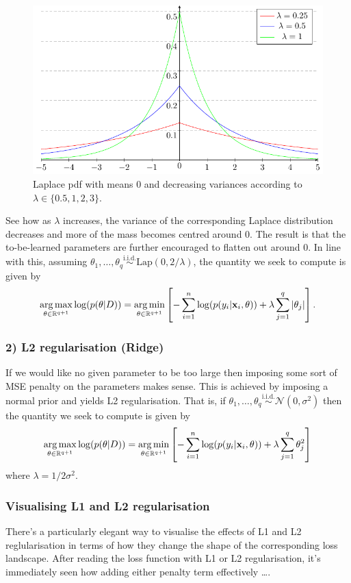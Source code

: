 \documentclass[11pt]{article}
\begin{document}
\begin{figure}[t]
    \centering
    \includegraphics[width=\columnwidth]{./figures/supervised_learning/laplace_pdf.pdf}
    \caption{Laplace pdf with means 0 and decreasing variances according to $\lambda\in\{0.5,1,2,3\}$.}
    \label{fig:laplace_pdf}
\end{figure}

See how as $\lambda$ increases, the variance of the corresponding Laplace distribution decreases and more of the mass becomes centred around 0. The result is that the to-be-learned parameters are further encouraged to flatten out around 0. In line with this, assuming $\theta_1,\dots,\theta_q\overset{\text{i.i.d.}}{\sim}\text{Lap}(0, 2/\lambda)$, the quantity we seek to compute is given by
$$
\operatorname*{arg\,max}_{\theta\in\mathbb{R}^{q+1}}\log(p(\theta|D))
=
\operatorname*{arg\,min}_{\theta\in\mathbb{R}^{q+1}}\left[-\sum_{i=1}^n\log(p(y_i|\mathbf{x}_i,\theta))+\lambda\sum_{j=1}^q|\theta_j|\right].
$$

\subsubsection*{2) L2 regularisation (Ridge)}
If we would like no given parameter to be too large then imposing some sort of MSE penalty on the parameters makes sense. This is achieved by imposing a normal prior and yields L2 regularisation. That is, if $\theta_1,\dots,\theta_q\overset{\text{i.i.d.}}{\sim}\mathcal{N}(0,\sigma^2)$ then the quantity we seek to compute is given by
$$
\operatorname*{arg\,max}_{\theta\in\mathbb{R}^{q+1}}\log(p(\theta|D))
=
\operatorname*{arg\,min}_{\theta\in\mathbb{R}^{q+1}}\left[-\sum_{i=1}^n\log(p(y_i|\mathbf{x}_i,\theta))+\lambda\sum_{j=1}^q \theta_j^2\right]
$$
where $\lambda=1/2\sigma^2$.

\subsubsection*{Visualising L1 and L2 regularisation}
There's a particularly elegant way to visualise the effects of L1 and L2 reglularisation in terms of how they change the shape of the corresponding loss landscape. After reading the loss function with L1 or L2 regularisation, it's immediately seen how adding either penalty term effectively \dots.
\end{document}
